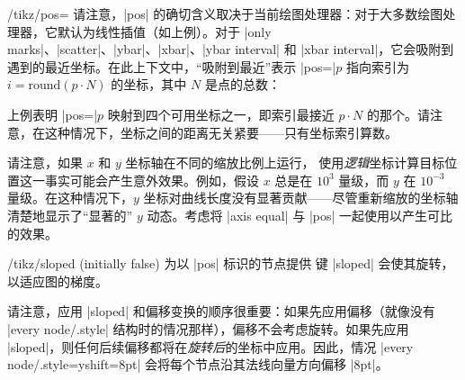 {\begin{key}{/tikz/pos=}
    请注意，|pos| 的确切含义取决于当前绘图处理器：对于大多数绘图处理器，它默认为线性插值（如上例）。对于 |only marks|、|scatter|、|ybar|、|xbar|、|ybar interval| 和 |xbar interval|，它会吸附到遇到的最近坐标。在此上下文中，“吸附到最近”表示 |pos=|$p$ 指向索引为 $i = \text{round}(p \cdot N)$ 的坐标，其中 $N$ 是点的总数：
\begin{codeexample}[]
\end{codeexample}
    \noindent 上例表明 |pos=|$p$ 映射到四个可用坐标之一，即索引最接近 $p\cdot N$ 的那个。请注意，在这种情况下，坐标之间的距离无关紧要——只有坐标索引算数。

    请注意，如果 $x$ 和 $y$ 坐标轴在不同的缩放比例上运行，\PGFPlots{} 使用\emph{逻辑}坐标计算目标位置这一事实可能会产生意外效果。例如，假设 $x$ 总是在 $10^3$ 量级，而 $y$ 在 $10^{-3}$ 量级。在这种情况下，$y$ 坐标对曲线长度没有显著贡献——尽管重新缩放的坐标轴清楚地显示了“显著的” $y$ 动态。考虑将 |axis equal| 与 |pos| 一起使用以产生可比的效果。
\end{key}

\begin{key}{/tikz/sloped (initially false)}
    为以 |pos| 标识的节点提供 \Tikz{} 键 |sloped| 会使其旋转，以适应图的梯度。
\pgfplotsexpensiveexample
\begin{codeexample}[]
\end{codeexample}
    请注意，应用 |sloped| 和偏移变换的顺序很重要：如果先应用偏移（就像没有 |every node/.style| 结构时的情况那样），偏移不会考虑旋转。如果先应用 |sloped|，则任何后续偏移都将在\emph{旋转后}的坐标中应用。因此，情况 |every node/.style={yshift=8pt}| 会将每个节点沿其法线向量方向偏移 |8pt|。


\end{key}}
